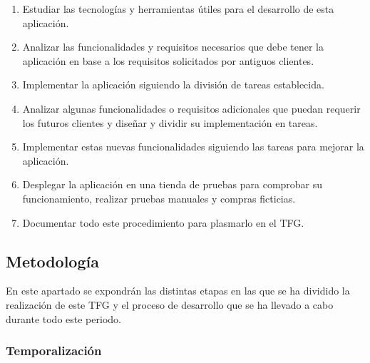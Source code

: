 \documentclass[11pt]{article}
\begin{document}
\begin{enumerate}
    \item Estudiar las tecnologías y herramientas útiles para el desarrollo de esta aplicación. \label{item:objetivo1}
    \item Analizar las funcionalidades y requisitos necesarios que debe tener la aplicación en base a los requisitos solicitados por antiguos clientes. \label{item:objetivo2}
    \item Implementar la aplicación siguiendo la división de tareas establecida. \label{item:objetivo4}
    \item Analizar algunas funcionalidades o requisitos adicionales que puedan requerir los futuros clientes y diseñar y dividir su implementación en tareas. \label{item:objetivo5}
    \item Implementar estas nuevas funcionalidades siguiendo las tareas para mejorar la aplicación. \label{item:objetivo6}
    \item Desplegar la aplicación en una tienda de pruebas para comprobar su funcionamiento, realizar pruebas manuales y compras ficticias. \label{item:objetivo7}
    \item Documentar todo este procedimiento para plasmarlo en el TFG. \label{item:objetivo8}
\end{enumerate}

\subsection{Metodología}
En este apartado se expondrán las distintas etapas en las que se ha dividido la realización de este TFG y el proceso de desarrollo que se ha 
llevado a cabo durante todo este periodo.

\subsubsection{Temporalización}
\end{document}
